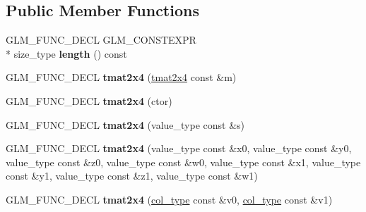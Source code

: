 \subsection*{Public Member Functions}
\begin{DoxyCompactItemize}
\item 
\hypertarget{structglm_1_1detail_1_1tmat2x4_a7aee55f854ec92b8fe7fac54f129b0c5}{G\-L\-M\-\_\-\-F\-U\-N\-C\-\_\-\-D\-E\-C\-L G\-L\-M\-\_\-\-C\-O\-N\-S\-T\-E\-X\-P\-R \\*
size\-\_\-type {\bfseries length} () const }\label{structglm_1_1detail_1_1tmat2x4_a7aee55f854ec92b8fe7fac54f129b0c5}

\item 
\hypertarget{structglm_1_1detail_1_1tmat2x4_ae82c79b06f81d05896740f1f2c2795de}{G\-L\-M\-\_\-\-F\-U\-N\-C\-\_\-\-D\-E\-C\-L {\bfseries tmat2x4} (\hyperlink{structglm_1_1detail_1_1tmat2x4}{tmat2x4} const \&m)}\label{structglm_1_1detail_1_1tmat2x4_ae82c79b06f81d05896740f1f2c2795de}

\item 
\hypertarget{structglm_1_1detail_1_1tmat2x4_ac0fb677645f6a217a555408a7005b318}{G\-L\-M\-\_\-\-F\-U\-N\-C\-\_\-\-D\-E\-C\-L {\bfseries tmat2x4} (ctor)}\label{structglm_1_1detail_1_1tmat2x4_ac0fb677645f6a217a555408a7005b318}

\item 
\hypertarget{structglm_1_1detail_1_1tmat2x4_ac408581b742a59fb16a6e800ef6bdc5f}{G\-L\-M\-\_\-\-F\-U\-N\-C\-\_\-\-D\-E\-C\-L {\bfseries tmat2x4} (value\-\_\-type const \&s)}\label{structglm_1_1detail_1_1tmat2x4_ac408581b742a59fb16a6e800ef6bdc5f}

\item 
\hypertarget{structglm_1_1detail_1_1tmat2x4_acbba6d5443699632d8aa730077fdc538}{G\-L\-M\-\_\-\-F\-U\-N\-C\-\_\-\-D\-E\-C\-L {\bfseries tmat2x4} (value\-\_\-type const \&x0, value\-\_\-type const \&y0, value\-\_\-type const \&z0, value\-\_\-type const \&w0, value\-\_\-type const \&x1, value\-\_\-type const \&y1, value\-\_\-type const \&z1, value\-\_\-type const \&w1)}\label{structglm_1_1detail_1_1tmat2x4_acbba6d5443699632d8aa730077fdc538}

\item 
\hypertarget{structglm_1_1detail_1_1tmat2x4_a0cf8f30e8d54baddb57f4091e27f30df}{G\-L\-M\-\_\-\-F\-U\-N\-C\-\_\-\-D\-E\-C\-L {\bfseries tmat2x4} (\hyperlink{structglm_1_1detail_1_1tvec4}{col\-\_\-type} const \&v0, \hyperlink{structglm_1_1detail_1_1tvec4}{col\-\_\-type} const \&v1)}\label{structglm_1_1detail_1_1tmat2x4_a0cf8f30e8d54baddb57f4091e27f30df}


\end{DoxyCompactItemize}
